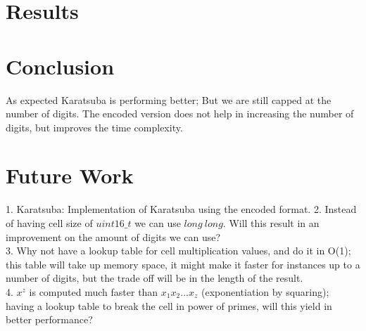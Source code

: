 \documentclass{DIKU-report}
\begin{document}
\section{Results}
\begin{figure}[h]
\end{figure}
\begin{figure}[h]
\end{figure}
\vspace*{\fill}
\newpage
\section{Conclusion}
As expected Karatsuba is performing better; But we are still capped at the number of digits. The encoded version does not help in increasing the number of digits, but improves the time complexity. 
\section{Future Work}
1. Karatsuba: Implementation of Karatsuba using the encoded format. 
2. Instead of having cell size of $uint16\_t$ we can use $long\ long$. Will this result in an improvement on the amount of digits we can use?\\
3. Why not have a lookup table for cell multiplication values, and do it in O(1); this table will take up memory space, it might make it faster for instances up to a number of digits, but the trade off will be in the length of the result.\\
4. $x^{z}$ is computed much faster than $x_1x_2...x_z$ (exponentiation by squaring); having a lookup table to break the cell in power of primes, will this yield in better performance?
\end{document}
